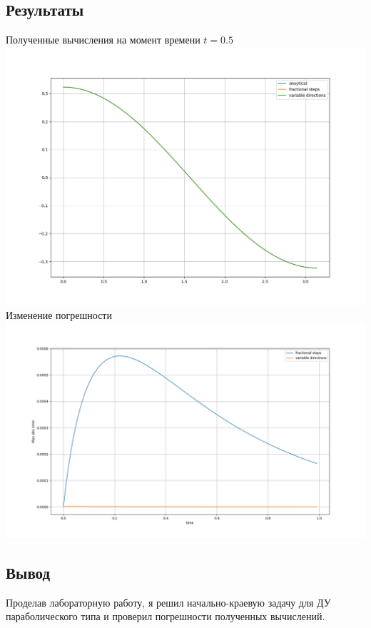 \documentclass{article}
\begin{document}
\subsection*{Результаты}
\begin{center}
Полученные вычисления на момент времени $ t = 0.5 $
\\
\includegraphics[scale=0.25]{img/img01.png}
\pagebreak
\\
Изменение погрешности
\\
\includegraphics[scale=0.25]{img/img02.png}
\end{center}

\subsection*{Вывод}
Проделав лабораторную работу, я решил начально-краевую задачу для ДУ 
параболического типа и проверил погрешности полученных вычислений.
\end{document}
